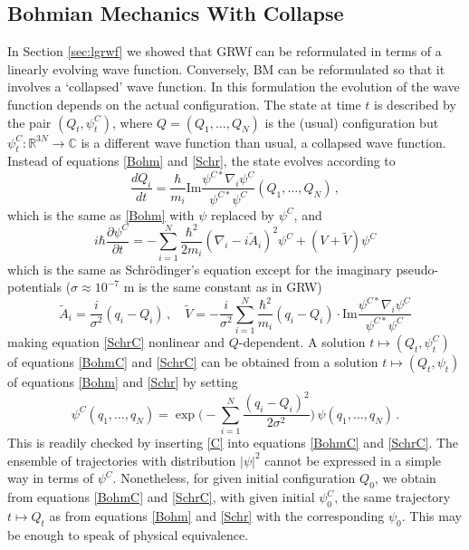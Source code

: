 \documentclass[12pt]{article}
\renewcommand{\Im}{\mathrm{Im}}
\newcommand{\RRR}{\mathbb{R}}
\newcommand{\CCC}{\mathbb{C}}
\begin{document}
\subsection{Bohmian Mechanics With Collapse}
\label{sec:BMC}
In Section \ref{sec:lgrwf} we showed that {\sf GRWf} can be reformulated in terms of a linearly evolving wave function. 
Conversely, {\sf BM} can be reformulated so that it involves a `collapsed' wave function. In this formulation the evolution of the wave function depends on the actual configuration. 
The state at time $t$ is described by the pair $(Q_t,\psi_t^C)$, where $Q=(Q_1,\ldots, Q_N)$ is the (usual) configuration but $\psi_t^C: \RRR^{3N} \to \CCC$
is a different wave function than usual, a collapsed wave function. Instead of equations \eqref{Bohm} and \eqref{Schr}, the state evolves according to
\begin{equation}\label{BohmC}
  \frac{dQ_i}{dt} = \frac{\hbar}{m_i} \Im \frac{\psi^{C*}\nabla_i \psi^C}{\psi^{C*}\psi^C} (Q_1,\ldots, Q_N)\,,
\end{equation}
which is the same as \eqref{Bohm} with $\psi$ replaced by $\psi^C$, and
\begin{equation}\label{SchrC}
  i\hbar\frac{\partial \psi^C}{\partial t} = - \sum_{i=1}^N
  \frac{\hbar^2}{2m_i} (\nabla_i- i\tilde A_i)^2 \psi^C +
  (V+\tilde V) \psi^C
\end{equation}
which is the same as  Schr\"odinger's equation except for the imaginary  pseudo-potentials ($\sigma \approx 10^{-7}$ m is the same constant as in {\sf GRW})
\begin{equation}
  \tilde A_i = \frac{i}{\sigma^2}(q_i -Q_i) \,, \quad \tilde V = -\frac{i}{\sigma^2}
  \sum_{i=1}^N \frac{\hbar^2}{m_i}(q_i-Q_i) \cdot \Im \frac{\psi^{C*} \nabla_i \psi^C}{\psi^{C*} \psi^C}\end{equation}
making equation \eqref{SchrC} nonlinear and $Q$-dependent. A solution $t \mapsto (Q_t, \psi_t^C)$ of equations \eqref{BohmC} and \eqref{SchrC} can be obtained from a solution $t \mapsto (Q_t,\psi_t)$ of equations \eqref{Bohm} and \eqref{Schr} by setting
\begin{equation}\label{C}
  \psi^C (q_1,\ldots,q_N) = \exp\biggl( - \sum_{i=1}^N
  \frac{(q_i-Q_i)^2}{2\sigma^2} \biggr) \, \psi (q_1,\ldots,q_N)\,.
\end{equation}
This is readily checked by inserting \eqref{C} into equations \eqref{BohmC} and \eqref{SchrC}. The ensemble of trajectories with distribution $|\psi|^2$ cannot be expressed in a simple way in terms of $\psi^C$. Nonetheless, for given initial configuration $Q_0$, we obtain from equations \eqref{BohmC} and \eqref{SchrC}, with given initial $\psi_0^C$, the same trajectory $t \mapsto Q_t$ as from equations \eqref{Bohm} and \eqref{Schr} with the corresponding $\psi_0$. This may be enough to speak of physical equivalence.
\end{document}
